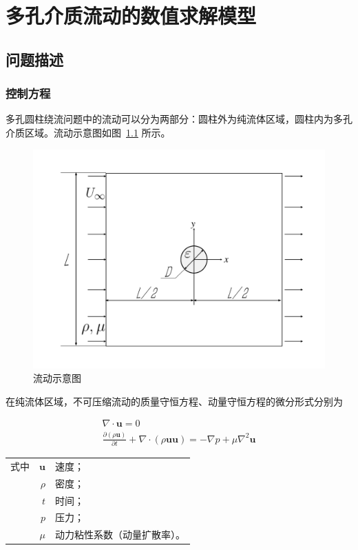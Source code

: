 \chapter{多孔介质流动的数值求解模型}\label{chap: numerical model}

\section{问题描述}\label{sec: problem description}

\subsection{控制方程} %

多孔圆柱绕流问题中的流动可以分为两部分：圆柱外为纯流体区域，圆柱内为多孔介质区域。流动示意图如图~\ref{fig: cylinder} 所示。

\begin{figure}
	\centering
	\includegraphics[scale=.7]{figs/cylinder}
	\caption{流动示意图}\label{fig: cylinder}
\end{figure}

在纯流体区域，不可压缩流动的质量守恒方程、动量守恒方程的微分形式分别为

\begin{gather}
	\nabla \cdot \bm{u} = 0 \\
	\frac{\partial(\rho\bm{u})}{\partial t} + \nabla \cdot (\rho\bm{u}\bm{u}) = -\nabla p + \mu\nabla^2\bm{u}
\end{gather}
\begin{tabularx}{\textwidth}{@{}l@{\quad}r@{——}X@{}}
	式中 & $\bm{u}$ & 速度；\\
		& $\rho$ & 密度；\\
		& $t$ & 时间；\\
		& $p$ & 压力；\\
		& $\mu$ & 动力粘性系数（动量扩散率）。
\end{tabularx}\vspace{3.15bp}


